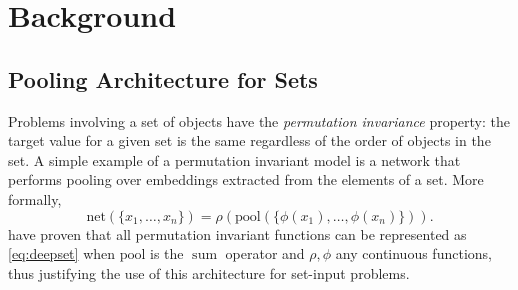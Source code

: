 \section{Background}
\label{sec:background}

\subsection{Pooling Architecture for Sets}
\label{subsec:pooling}

Problems involving a set of objects have the \textit{permutation invariance} property: the target value for a given set is the same regardless of the order of objects in the set.
A simple example of a permutation invariant model is a network that performs pooling over embeddings extracted from the elements of a set.
More formally,
\[
\label{eq:deepset}
\mathrm{net}(\{x_1, \ldots, x_n \}) = \rho( \mathrm{pool}( \{ \phi(x_1), \ldots, \phi(x_n) \})).
\]
\citet{Zaheer2017} have proven that all permutation invariant functions can be represented as \eqref{eq:deepset} when $\mathrm{pool}$ is the $\operatorname{sum}$ operator and $\rho, \phi$ any continuous functions, thus justifying the use of this architecture for set-input problems.

